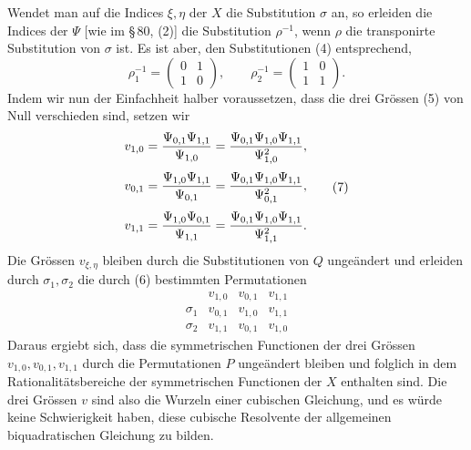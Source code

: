 \documentclass[11pt]{article}
\providecommand{\mat}[4]{\begin{pmatrix}#1&#2\\#3&#4\end{pmatrix}}
\providecommand{\mat}[4]{\begin{pmatrix}#1&#2\\#3&#4\end{pmatrix}}
\begin{document}
Wendet man auf die Indices $\xi,\eta$ der $X$ die Substitution $\sigma$ an, so erleiden die Indices der $\Psi$ [wie im \S\,80, (2)] die Substitution $\rho^{-1}$, wenn $\rho$ die transponirte Substitution von $\sigma$ ist. Es ist aber, den Substitutionen (4) entsprechend,
\begin{equation}
 \rho_1^{-1}=\mat{0}{1}{1}{0},
 \qquad
 \rho_2^{-1}=\mat{1}{0}{1}{1}.
 \tag{6}
\end{equation}
Indem wir nun der Einfachheit halber voraussetzen, dass die drei Grössen (5) von Null verschieden sind, setzen wir
\begin{equation}
\begin{aligned}
 v_{1,0}&={\Psi_{0,1}\Psi_{1,1}\over\Psi_{1,0}}={\Psi_{0,1}\Psi_{1,0}\Psi_{1,1}\over\Psi_{1,0}^2},\\[0.25em]
 v_{0,1}&={\Psi_{1,0}\Psi_{1,1}\over\Psi_{0,1}}={\Psi_{0,1}\Psi_{1,0}\Psi_{1,1}\over\Psi_{0,1}^2},\\[0.25em]
 v_{1,1}&={\Psi_{1,0}\Psi_{0,1}\over\Psi_{1,1}}={\Psi_{0,1}\Psi_{1,0}\Psi_{1,1}\over\Psi_{1,1}^2}.
\end{aligned}
\tag{7}
\end{equation}
Die Grössen $v_{\xi,\eta}$ bleiben durch die Substitutionen von $Q$ ungeändert und erleiden durch $\sigma_1,\sigma_2$ die durch (6) bestimmten Permutationen
\[
\begin{array}{c|ccc}
&v_{1,0}&v_{0,1}&v_{1,1}\\
\sigma_1&v_{0,1}&v_{1,0}&v_{1,1}\\
\sigma_2&v_{1,1}&v_{0,1}&v_{1,0}
\end{array}
\]
Daraus ergiebt sich, dass die symmetrischen Functionen der drei Grössen $v_{1,0},v_{0,1},v_{1,1}$ durch die Permutationen $P$ ungeändert bleiben und folglich in dem Rationalitätsbereiche der symmetrischen Functionen der $X$ enthalten sind. Die drei Grössen $v$ sind also die Wurzeln einer cubischen Gleichung, und es würde keine Schwierigkeit haben, diese cubische Resolvente der allgemeinen biquadratischen Gleichung zu bilden.
\end{document}
